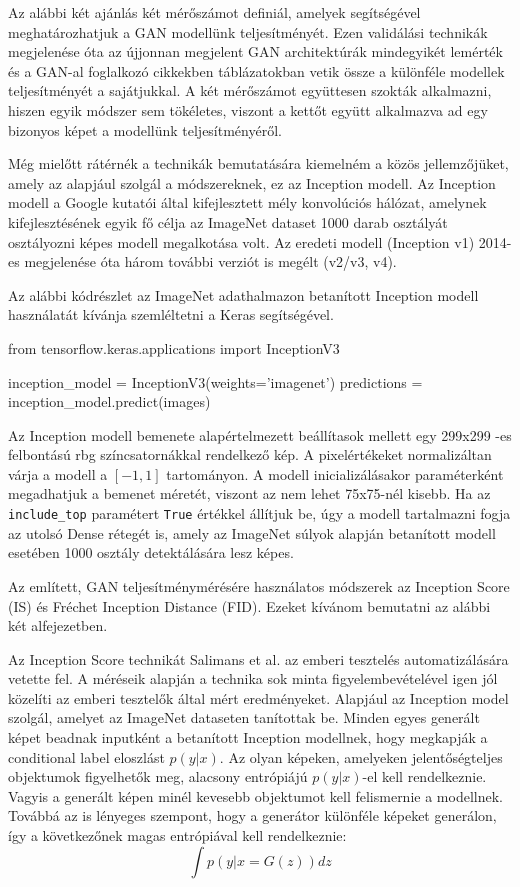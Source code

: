 Az alábbi két ajánlás két mérőszámot definiál, amelyek segítségével meghatározhatjuk a GAN modellünk teljesítményét. Ezen validálási technikák megjelenése óta az újjonnan megjelent GAN architektúrák mindegyikét lemérték és a GAN-al foglalkozó cikkekben táblázatokban vetik össze a különféle modellek teljesítményét a sajátjukkal.
A két mérőszámot együttesen szokták alkalmazni, hiszen egyik módszer sem tökéletes, viszont a kettőt együtt alkalmazva ad egy bizonyos képet a modellünk teljesítményéről.

Még mielőtt rátérnék a technikák bemutatására kiemelném a közös jellemzőjüket, amely az alapjául szolgál a módszereknek, ez az Inception modell. Az Inception modell a Google kutatói által kifejlesztett mély konvolúciós hálózat, amelynek kifejlesztésének egyik fő célja az ImageNet dataset 1000 darab osztályát osztályozni képes modell megalkotása volt. Az eredeti modell (Inception v1) 2014-es megjelenése óta három további verziót is megélt (v2/v3, v4).

Az alábbi kódrészlet az ImageNet adathalmazon betanított Inception modell használatát kívánja szemléltetni a Keras segítségével.

\begin{python}
from tensorflow.keras.applications import InceptionV3

inception_model = InceptionV3(weights='imagenet')
predictions = inception_model.predict(images)
\end{python}

Az Inception modell bemenete alapértelmezett beállítasok mellett egy 299x299 -es felbontású rbg színcsatornákkal rendelkező kép. A pixelértékeket normalizáltan várja a modell a $[-1, 1]$ tartományon. A modell inicializálásakor paraméterként megadhatjuk a bemenet méretét, viszont az nem lehet 75x75-nél kisebb. Ha az \texttt{include\_top} paramétert \texttt{True} értékkel állítjuk be, úgy a modell tartalmazni fogja az utolsó Dense rétegét is, amely az ImageNet súlyok alapján betanított modell esetében 1000 osztály detektálására lesz képes.


Az említett, GAN teljesítménymérésére használatos módszerek az Inception Score (IS) és Fréchet Inception Distance (FID). Ezeket kívánom bemutatni az alábbi két alfejezetben.

Az Inception Score technikát Salimans et al. az emberi tesztelés automatizálására vetette fel. A méréseik alapján a technika sok minta figyelembevételével igen jól közelíti az emberi tesztelők által mért eredményeket.
Alapjául az Inception model szolgál, amelyet az ImageNet dataseten tanítottak be. Minden egyes generált képet beadnak inputként a betanított Inception modellnek, hogy megkapják a conditional label eloszlást $p(y|x)$. Az olyan képeken, amelyeken jelentőségteljes objektumok figyelhetők meg, alacsony entrópiájú $p(y|x)$-el kell rendelkeznie. Vagyis a generált képen minél kevesebb objektumot kell felismernie a modellnek.
Továbbá az is lényeges szempont, hogy a generátor különféle képeket generálon, így a következőnek magas entrópiával kell rendelkeznie:
$$ \int p(y|x = G(z))dz $$

